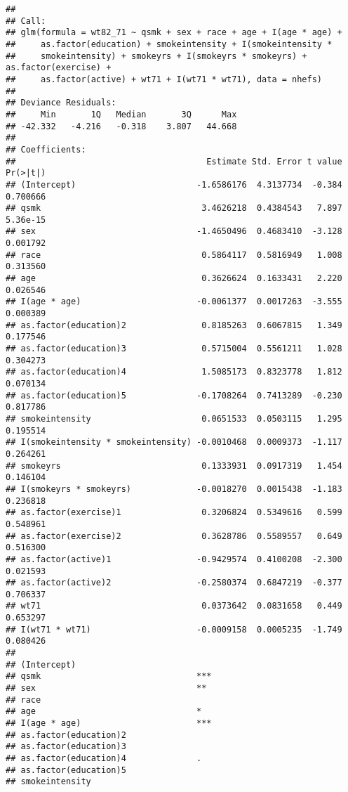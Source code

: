 \documentclass[10pt,]{book}
\begin{document}
\begin{verbatim}
## 
## Call:
## glm(formula = wt82_71 ~ qsmk + sex + race + age + I(age * age) + 
##     as.factor(education) + smokeintensity + I(smokeintensity * 
##     smokeintensity) + smokeyrs + I(smokeyrs * smokeyrs) + as.factor(exercise) + 
##     as.factor(active) + wt71 + I(wt71 * wt71), data = nhefs)
## 
## Deviance Residuals: 
##     Min       1Q   Median       3Q      Max  
## -42.332   -4.216   -0.318    3.807   44.668  
## 
## Coefficients:
##                                      Estimate Std. Error t value Pr(>|t|)
## (Intercept)                        -1.6586176  4.3137734  -0.384 0.700666
## qsmk                                3.4626218  0.4384543   7.897 5.36e-15
## sex                                -1.4650496  0.4683410  -3.128 0.001792
## race                                0.5864117  0.5816949   1.008 0.313560
## age                                 0.3626624  0.1633431   2.220 0.026546
## I(age * age)                       -0.0061377  0.0017263  -3.555 0.000389
## as.factor(education)2               0.8185263  0.6067815   1.349 0.177546
## as.factor(education)3               0.5715004  0.5561211   1.028 0.304273
## as.factor(education)4               1.5085173  0.8323778   1.812 0.070134
## as.factor(education)5              -0.1708264  0.7413289  -0.230 0.817786
## smokeintensity                      0.0651533  0.0503115   1.295 0.195514
## I(smokeintensity * smokeintensity) -0.0010468  0.0009373  -1.117 0.264261
## smokeyrs                            0.1333931  0.0917319   1.454 0.146104
## I(smokeyrs * smokeyrs)             -0.0018270  0.0015438  -1.183 0.236818
## as.factor(exercise)1                0.3206824  0.5349616   0.599 0.548961
## as.factor(exercise)2                0.3628786  0.5589557   0.649 0.516300
## as.factor(active)1                 -0.9429574  0.4100208  -2.300 0.021593
## as.factor(active)2                 -0.2580374  0.6847219  -0.377 0.706337
## wt71                                0.0373642  0.0831658   0.449 0.653297
## I(wt71 * wt71)                     -0.0009158  0.0005235  -1.749 0.080426
##                                       
## (Intercept)                           
## qsmk                               ***
## sex                                ** 
## race                                  
## age                                *  
## I(age * age)                       ***
## as.factor(education)2                 
## as.factor(education)3                 
## as.factor(education)4              .  
## as.factor(education)5                 
## smokeintensity                        

\end{verbatim}
\end{document}
